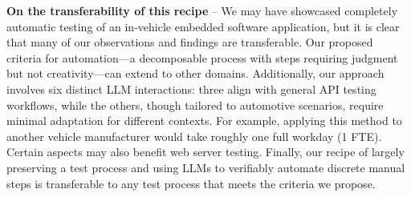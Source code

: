 \noindent \textbf{On the transferability of this recipe} -- We may have showcased completely automatic testing of an in-vehicle embedded software application, but it is clear that many of our observations and findings are transferable.
Our proposed criteria for automation—a decomposable process with steps requiring judgment but not creativity—can extend to other domains. Additionally, our approach involves six distinct LLM interactions: three align with general API testing workflows, while the others, though tailored to automotive scenarios, require minimal adaptation for different contexts. For example, applying this method to another vehicle manufacturer would take roughly one full workday (1 FTE). Certain aspects may also benefit web server testing. 
Finally, our recipe of largely preserving a test process and using LLMs to verifiably automate discrete manual steps is transferable to any test process that meets the criteria we propose. 
